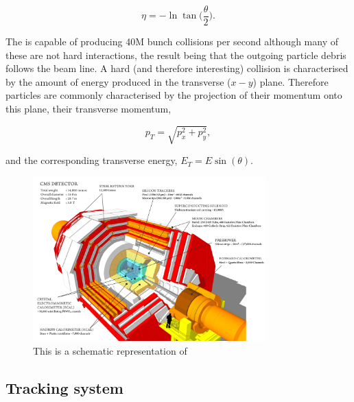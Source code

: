 \begin{equation}
	\eta = -\ln\tan\biggl(\frac{\theta}{2}\biggr).
\end{equation}

The \LHC is capable of producing 40M bunch collisions per second although many of these are not hard interactions, the result being that the outgoing particle debris follows the beam line. A hard (and therefore interesting) collision is characterised by the amount of energy produced in the transverse ($x-y$) plane. Therefore particles are commonly characterised by the projection of their momentum onto this plane, their transverse momentum,

\begin{equation}
	p_{T} = \sqrt{p_{x}^{2}+p_{y}^{2}},
\end{equation}

and the corresponding transverse energy, $E_{T} = E\sin(\theta)$.

\begin{figure}
  \includegraphics[width=0.8\textwidth]{ch2_cms_exp/plots/cms_diagram.png}
  \caption[CMS diagram]{This is a schematic representation of \CMS}
  \label{fig:cms_diagram}
\end{figure}

\subsection{Tracking system}


